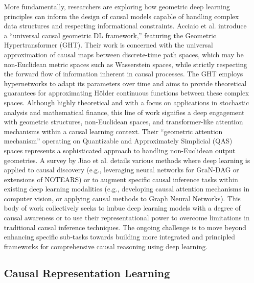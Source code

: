 {{More fundamentally, researchers are exploring how geometric deep learning principles can inform the design of causal models capable of handling complex data structures and respecting informational constraints. Acciaio et al. \cite{acciaio2024designing} introduce a ``universal causal geometric DL framework,'' featuring the Geometric Hypertransformer (GHT). Their work is concerned with the universal approximation of causal maps between discrete-time path spaces, which may be non-Euclidean metric spaces such as Wasserstein spaces, while strictly respecting the forward flow of information inherent in causal processes. The GHT employs hypernetworks to adapt its parameters over time and aims to provide theoretical guarantees for approximating Hölder continuous functions between these complex spaces. Although highly theoretical and with a focus on applications in stochastic analysis and mathematical finance, this line of work signifies a deep engagement with geometric structures, non-Euclidean spaces, and transformer-like attention mechanisms within a causal learning context. Their ``geometric attention mechanism'' operating on Quantizable and Approximately Simplicial (QAS) spaces represents a sophisticated approach to handling non-Euclidean output geometries. A survey by Jiao et al. \cite{jiao2024causal} details various methods where deep learning is applied to causal discovery (e.g., leveraging neural networks for GraN-DAG or extensions of NOTEARS) or to augment specific causal inference tasks within existing deep learning modalities (e.g., developing causal attention mechanisms in computer vision, or applying causal methods to Graph Neural Networks). This body of work collectively seeks to imbue deep learning models with a degree of causal awareness or to use their representational power to overcome limitations in traditional causal inference techniques. The ongoing challenge is to move beyond enhancing specific sub-tasks towards building more integrated and principled frameworks for comprehensive causal reasoning using deep learning.

\subsection{Causal Representation Learning}

}}
